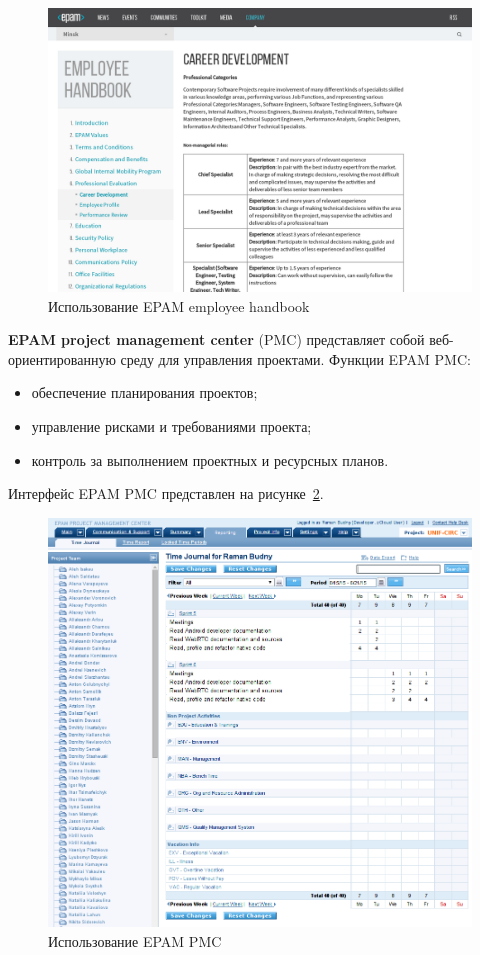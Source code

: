 \begin{figure}[h!]
  \centering
  \includegraphics[width=150mm]{pic/epam_handbook.png}
  \caption{Использование EPAM employee handbook}
  \label{pic:epam_handbook}
\end{figure}

\newpage


\textbf{EPAM project management center} (PMC) представляет собой веб-ориентированную среду
для управления проектами. 
Функции EPAM PMC:
\begin{itemize}
\item обеспечение планирования проектов;
\item управление рисками и требованиями проекта;
\item контроль за выполнением проектных и ресурсных планов.
\end{itemize}

Интерфейс EPAM PMC представлен на рисунке~\ref{pic:epam_pmc}.

\begin{figure}[h!]
  \centering
  \includegraphics[width=150mm]{pic/epam_pmc.png}
  \caption{Использование EPAM PMC}
  \label{pic:epam_pmc}
\end{figure}

